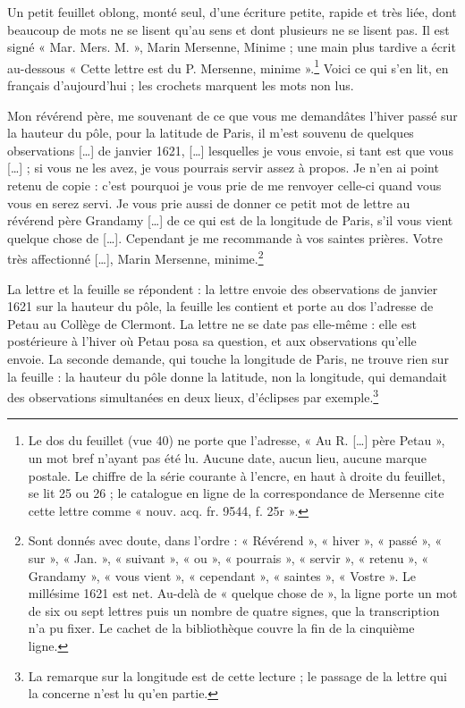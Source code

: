 \documentclass[11pt,a4paper]{article}
\begin{document}
Un petit feuillet oblong, monté seul, d'une écriture petite, rapide et très
liée, dont beaucoup de mots ne se lisent qu'au sens et dont plusieurs ne
se lisent pas. Il est signé « Mar. Mers. M. », Marin Mersenne, Minime ; une
main plus tardive a écrit au-dessous « Cette lettre est du P. Mersenne,
minime ».\footnote{Le dos du feuillet (vue 40) ne porte que l'adresse, « Au
R. […] père Petau », un mot bref n'ayant pas été lu. Aucune date, aucun lieu,
aucune marque postale. Le chiffre de la série courante à l'encre, en haut à
droite du feuillet, se lit 25 ou 26 ; le catalogue en ligne de la
correspondance de Mersenne cite cette lettre comme « nouv. acq. fr. 9544,
f. 25r ».} Voici ce qui s'en lit, en français d'aujourd'hui ; les crochets
marquent les mots non lus.

Mon révérend père, me souvenant de ce que vous me demandâtes l'hiver passé
sur la hauteur du pôle, pour la latitude de Paris, il m'est souvenu de
quelques observations […] de janvier 1621, […] lesquelles je vous envoie, si
tant est que vous […] ; si vous ne les avez, je vous pourrais servir assez à
propos. Je n'en ai point retenu de copie : c'est pourquoi je vous prie de me
renvoyer celle-ci quand vous vous en serez servi. Je vous prie aussi de
donner ce petit mot de lettre au révérend père Grandamy […] de ce qui est de
la longitude de Paris, s'il vous vient quelque chose de […]. Cependant je me
recommande à vos saintes prières. Votre très affectionné […], Marin Mersenne,
minime.\footnote{Sont donnés avec doute, dans l'ordre : « Révérend »,
« hiver », « passé », « sur », « Jan. », « suivant », « ou », « pourrais »,
« servir », « retenu », « Grandamy », « vous vient », « cependant »,
« saintes », « Vostre ». Le millésime 1621 est net. Au-delà de « quelque chose
de », la ligne porte un mot de six ou sept lettres puis un nombre de quatre
signes, que la transcription n'a pu fixer. Le cachet de la bibliothèque couvre
la fin de la cinquième ligne.}

La lettre et la feuille se répondent : la lettre envoie des observations de
janvier 1621 sur la hauteur du pôle, la feuille les contient et porte au dos
l'adresse de Petau au Collège de Clermont. La lettre ne se date pas
elle-même : elle est postérieure à l'hiver où Petau posa sa question, et aux
observations qu'elle envoie. La seconde demande, qui touche la longitude de
Paris, ne trouve rien sur la feuille : la hauteur du pôle donne la latitude,
non la longitude, qui demandait des observations simultanées en deux lieux,
d'éclipses par exemple.\footnote{La remarque sur la longitude est de cette
lecture ; le passage de la lettre qui la concerne n'est lu qu'en partie.}
\end{document}
